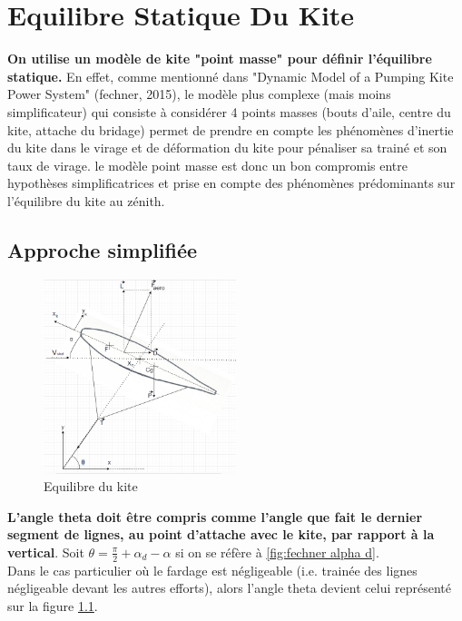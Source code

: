 \chapter{\textbf{Equilibre Statique Du Kite}}
\label{ch:Ch2}

\textbf{On utilise un modèle de kite "point masse" pour définir l'équilibre statique.} En effet, comme mentionné dans "Dynamic Model of a Pumping Kite Power System" (fechner, 2015), le modèle plus complexe (mais moins simplificateur) qui consiste à considérer 4 points masses (bouts d'aile, centre du kite, attache du bridage) permet de prendre en compte les phénomènes d'inertie du kite dans le virage et de déformation du kite pour pénaliser sa trainé et son taux de virage. le modèle point masse est donc un bon compromis entre hypothèses simplificatrices et prise en compte des phénomènes prédominants sur l'équilibre du kite au zénith. 

\section{Approche simplifiée} 
\label{sec:Ch2.1}

\begin{figure}[H]
    \centering
    \includegraphics[width=0.5\textwidth]{Pics/02 - Equilibre Statique du Kite/Equilibre Kite.png}  
    \caption{Equilibre du kite}
    \label{fig:Equilibre du kite}
\end{figure}

\textbf{L'angle theta doit être compris comme l'angle que fait le dernier segment de lignes, au point d'attache avec le kite, par rapport à la vertical}. Soit $\theta = \frac{\pi}{2} + \alpha_d - \alpha$ si on se réfère à \ref{fig:fechner alpha d}.\\

Dans le cas particulier où le fardage est négligeable (i.e. trainée des lignes négligeable devant les autres efforts), alors l'angle theta devient celui représenté sur la figure \ref{fig:Equilibre du kite}.

